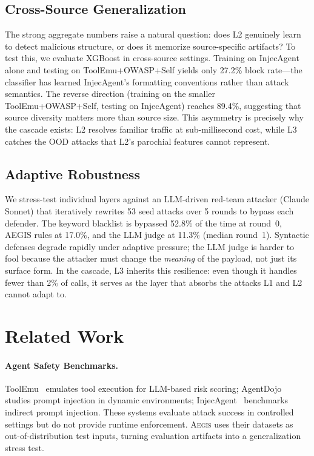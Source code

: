 \documentclass[sigplan,review,anonymous]{acmart}
\newcommand{\system}{\textsc{Aegis}\xspace}
\begin{document}
\subsection{Cross-Source Generalization}
\label{sec:cross}

The strong aggregate numbers raise a natural question: does L2 genuinely learn to detect malicious structure, or does it memorize source-specific artifacts?
To test this, we evaluate XGBoost in cross-source settings.
Training on InjecAgent alone and testing on ToolEmu+OWASP+Self yields only 27.2\% block rate---the classifier has learned InjecAgent's formatting conventions rather than attack semantics.
The reverse direction (training on the smaller ToolEmu+OWASP+Self, testing on InjecAgent) reaches 89.4\%, suggesting that source diversity matters more than source size.
This asymmetry is precisely why the cascade exists: L2 resolves familiar traffic at sub-millisecond cost, while L3 catches the OOD attacks that L2's parochial features cannot represent.

\subsection{Adaptive Robustness}

We stress-test individual layers against an LLM-driven red-team attacker (Claude Sonnet) that iteratively rewrites 53 seed attacks over 5 rounds to bypass each defender.
The keyword blacklist is bypassed 52.8\% of the time at round~0, AEGIS rules at 17.0\%, and the LLM judge at 11.3\% (median round~1).
Syntactic defenses degrade rapidly under adaptive pressure; the LLM judge is harder to fool because the attacker must change the \emph{meaning} of the payload, not just its surface form.
In the cascade, L3 inherits this resilience: even though it handles fewer than 2\% of calls, it serves as the layer that absorbs the attacks L1 and L2 cannot adapt to.

\section{Related Work}
\label{sec:related}

\paragraph{Agent Safety Benchmarks.}
ToolEmu~\cite{ruan2024toolemu} emulates tool execution for LLM-based risk scoring; AgentDojo~\cite{debenedetti2024agentsec} studies prompt injection in dynamic environments; InjecAgent~\cite{zhan2024injecagent} benchmarks indirect prompt injection. These systems evaluate attack success in controlled settings but do not provide runtime enforcement. \system uses their datasets as out-of-distribution test inputs, turning evaluation artifacts into a generalization stress test.
\end{document}
